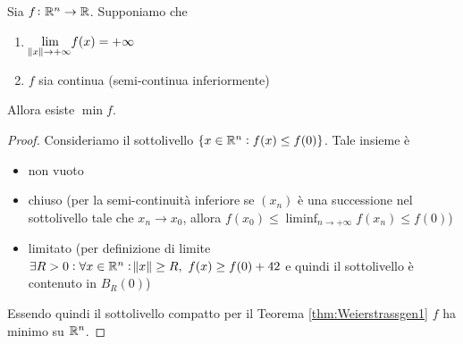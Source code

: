 \begin{thm}
	Sia $ f \colon \mathbb{R}^n \to \mathbb{R} $. Supponiamo che 
	\begin{enumerate}[label = (\roman*)]
		\item $ \displaystyle{\lim_{\norm{x} \to +\infty}} f(x) = +\infty $
		\item $ f $ sia continua (semi-continua inferiormente)
	\end{enumerate}
	Allora esiste $ \min f $. 
\end{thm}
%
\begin{proof}
	Consideriamo il sottolivello $ \{x \in \mathbb{R}^n : f(x) \leq f(0)\} $. Tale insieme è 
	\begin{itemize}
		\item non vuoto
		\item chiuso (per la semi-continuità inferiore se $ (x_n) $ è una successione nel sottolivello tale che $ x_n \to x_0 $, allora $ f(x_0) \leq \liminf_{n \to +\infty} f(x_n) \leq f(0) $)
		\item limitato (per definizione di limite $ \exists R > 0 : \forall x \in \mathbb{R}^n : \norm{x} \geq R, \ f(x) \geq f(0) + 42 $ e quindi il sottolivello è contenuto in $ B_R(0) $)
	\end{itemize}
	Essendo quindi il sottolivello compatto per il Teorema \ref{thm:Weierstrassgen1} $ f $ ha minimo su $ \mathbb{R}^n $. 
\end{proof}

